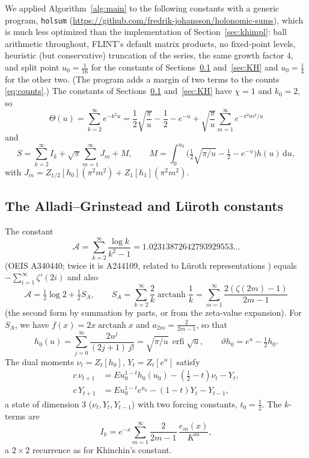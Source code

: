 \documentclass[11pt]{amsart}
\theoremstyle{definition}
\theoremstyle{remark}
\newcommand{\erfi}{\operatorname{erfi}}
\newcommand{\arctanh}{\operatorname{arctanh}}
\newcommand{\dd}{\,\mathrm{d}}
\begin{document}
We applied Algorithm~\ref{alg:main} to the following constants with a generic program, \texttt{holsum}
(\url{https://github.com/fredrik-johansson/holonomic-sums}), which is much less optimized than the implementation of Section~\ref{sec:khimpl}: ball arithmetic
throughout, FLINT's default matrix products, no fixed-point levels, heuristic (but conservative) truncation of the
series, the same growth factor $4$, and split point $u_0 = \frac1{16}$ for the constants of
Sections~\ref{sec:AG} and~\ref{sec:KH} and $u_0 = \frac14$ for the other two. (The program adds a margin of two terms
to the counts \eqref{eq:counts}.) The constants of Sections~\ref{sec:AG} and~\ref{sec:KH} have $\chi = 1$ and $k_0 = 2$, so
\[
  \Theta(u) = \sum_{k=2}^{\infty}e^{-k^2u} = \frac12\sqrt{\frac\pi u} - \frac12 - e^{-u} + \sqrt{\frac\pi u}\sum_{m=1}^{\infty}e^{-\pi^2m^2/u}
\]
and
\[
  S = \sum_{k=2}^{\infty} I_k + \sqrt\pi\sum_{m=1}^{\infty}J_m + M, \qquad
  M = \int_0^{u_0}\bigl(\tfrac12\sqrt{\pi/u} - \tfrac12 - e^{-u}\bigr)h(u)\dd u,
\]
with $J_m = Z_{1/2}[h_0](\pi^2m^2) + Z_1[h_1](\pi^2m^2)$.

\subsection{The Alladi--Grinstead and L\"uroth constants}\label{sec:AG}
The constant
\[
  \mathcal A = \sum_{k=2}^{\infty}\frac{\log k}{k^2-1} = 1.02313872642793929553\ldots
\]
(OEIS A340440; twice it is A244109, related to L\"uroth representations \cite{Kal88,Fin03}) equals
$-\sum_{i=1}^{\infty}\zeta'(2i)$ and also
\[
  \mathcal A = \tfrac12\log2 + \tfrac12 S_A, \qquad
  S_A = \sum_{k=2}^{\infty}\frac{2}{k}\arctanh\frac1k = \sum_{m=1}^{\infty}\frac{2(\zeta(2m)-1)}{2m-1}
\]
(the second form by summation by parts, or from the zeta-value expansion). For $S_A$, we have
$f(x) = 2x\arctanh x$ and $a_{2m} = \frac{2}{2m-1}$, so that
\[
  h_0(u) = \sum_{j=0}^{\infty}\frac{2u^j}{(2j+1)\,j!} = \sqrt{\pi/u}\,\erfi\sqrt u, \qquad \vartheta h_0 = e^u - \tfrac12h_0 .
\]
The dual moments $\nu_t = Z_t[h_0]$, $Y_t = Z_t[e^u]$ satisfy
\begin{align*}
  c\,\nu_{t+1} &= Eu_0^{1-t}h_0(u_0) - (\tfrac12 - t)\nu_t - Y_t, \\
  c\,Y_{t+1} &= Eu_0^{1-t}e^{u_0} - (1-t)Y_t - Y_{t-1},
\end{align*}
a state of dimension $3$ ($\nu_t, Y_t, Y_{t-1}$) with two forcing constants, $t_0 = \frac12$. The $k$-terms are
\[
  I_k = e^{-x}\sum_{m=1}^{\infty} \frac{2}{2m-1}\,\frac{e_m(x)}{K^m},
\]
a $2\times2$ recurrence as for Khinchin's constant.
\end{document}
